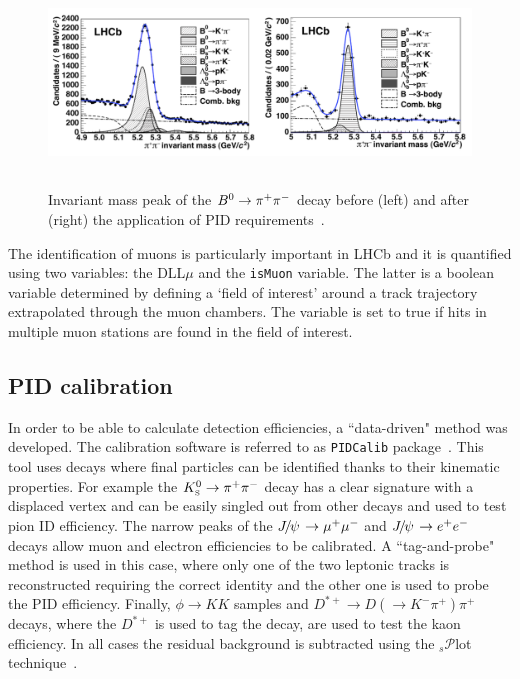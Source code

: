 \begin{figure}[h!]
\centering
\includegraphics[width=1.\textwidth,height=5.5cm]{Detector/figs/pid_peaks.png}
\caption{Invariant mass peak of the $\Bz\to\pi^+\pi^-$ decay before (left) and
after (right) the application of PID requirements~\cite{Aaij:1978280}. }
\label{fig:pid_peaks}
\end{figure}
%
The identification of muons is particularly important in LHCb and it is quantified using two variables: the DLL$\mu$
and the \verb!isMuon! variable. The latter is a boolean variable determined by defining a `field of interest' around 
a track trajectory extrapolated through the muon chambers. The variable is set to true if hits in multiple muon stations are 
found in the field of interest.

\subsection{PID calibration}
\label{sec:PID_calib}

In order to be able to calculate detection efficiencies, a ``data-driven" method was developed.
The calibration software is referred to as \verb!PIDCalib! package~\cite{Aaij:1978280}. 
This tool uses decays where final  particles can be identified thanks to their kinematic properties.
For example the $\KS\to\pi^+\pi^-$ decay has a clear signature with a displaced vertex
and can be easily singled out from other decays and used to test pion ID efficiency.
The narrow peaks of the $\jpsi\to\mumu$ and $\jpsi\to\ee$ decays allow
muon and electron efficiencies to be calibrated. A ``tag-and-probe" method is used in this case, 
where only one of the two leptonic tracks is reconstructed requiring the correct identity and the other
one is used to probe the PID efficiency. Finally,  $\phi\to KK$ samples and 
$D^{*+}\to D(\to K^-\pi^+)\pi^+$ decays, where the $D^{*+}$ is used to tag the decay,
are used to test the kaon efficiency. In all cases the residual background is subtracted using
the $_s\mathcal{P}$lot technique~\cite{sPlot}.


